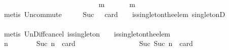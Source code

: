 \begin{isabellebody}
\ \ \ \ \ \ \ \ \ \ \ \ \isamarkupfalse%
\ {\isacartoucheopen}{\isasymforall}\ {\isasymsigma}\ {\isasymin}\ {\isasymSigma}{\isachardot}\ {\isasymforall}\ {\isasymsigma}{\isacharprime}\ {\isasymin}\ {\isasymSigma}{\isachardot}\ {\isasymnot}\ {\isasymsigma}\ {\isasymsubseteq}\ {\isasymsigma}{\isacharprime}\ {\isasymlongrightarrow}\ {\isacharparenleft}{\isasymexists}\ m\ {\isasymin}\ {\isasymsigma}\ {\isacharminus}\ {\isasymsigma}{\isacharprime}{\isachardot}\ {\isasymsigma}{\isacharprime}\ {\isasymunion}\ {\isacharbraceleft}m{\isacharbraceright}\ {\isasymin}\ {\isasymSigma}{\isacharparenright}{\isacartoucheclose}\ {\isacartoucheopen}{\isasymsigma}\ {\isasymin}\ {\isasymSigma}{\isacartoucheclose}\ {\isacartoucheopen}{\isasymsigma}{\isacharprime}\ {\isasymin}\ {\isasymSigma}{\isacartoucheclose}\isanewline
\ \ \ \ \ \ \ \ \ \ \ \ \isamarkupfalse%
\ {\isacharparenleft}metis\ Un{\isacharunderscore}commute\ {\isacartoucheopen}{\isasymnot}\ {\isasymsigma}\ {\isasymsubseteq}\ {\isasymsigma}{\isacharprime}\ {\isasymand}\ Suc\ {}\ {\isacharequal}\ card\ {\isacharparenleft}{\isasymsigma}\ {\isacharminus}\ {\isasymsigma}{\isacharprime}{\isacharparenright}{\isacartoucheclose}\ is{\isacharunderscore}singleton{\isacharunderscore}the{\isacharunderscore}elem\ singletonD{\isacharparenright}\isanewline
\ \ \ \ \ \ \ \ \ \ \isamarkupfalse%
\ \isamarkupfalse%
\ {\isachardoublequoteopen}{\isasymsigma}\ {\isasymunion}\ {\isasymsigma}{\isacharprime}\ {\isasymin}\ {\isasymSigma}{\isachardoublequoteclose}\isanewline
\ \ \ \ \ \ \ \ \ \ \ \ \isamarkupfalse%
\ {\isacharparenleft}metis\ Un{\isacharunderscore}Diff{\isacharunderscore}cancel{}\ {\isacartoucheopen}is{\isacharunderscore}singleton\ {\isacharparenleft}{\isasymsigma}\ {\isacharminus}\ {\isasymsigma}{\isacharprime}{\isacharparenright}{\isacartoucheclose}\ is{\isacharunderscore}singleton{\isacharunderscore}the{\isacharunderscore}elem{\isacharparenright}\ \ \ \isanewline
\ \ \ \ \ \ \ \ \isamarkupfalse%
\ \isanewline
\ \ \ \ \ \ \ \ \ \ \isamarkupfalse%
\ {\isachardoublequoteopen}{\isasymAnd}n{\isachardot}\ {\isasymforall}{\isasymsigma}{\isasymin}{\isasymSigma}{\isachardot}\ {\isasymforall}{\isasymsigma}{\isacharprime}{\isasymin}{\isasymSigma}{\isachardot}\ {\isasymnot}\ {\isasymsigma}\ {\isasymsubseteq}\ {\isasymsigma}{\isacharprime}\ {\isasymand}\ Suc\ n\ {\isacharequal}\ card\ {\isacharparenleft}{\isasymsigma}\ {\isacharminus}\ {\isasymsigma}{\isacharprime}{\isacharparenright}\ {\isasymlongrightarrow}\ {\isasymsigma}\ {\isasymunion}\ {\isasymsigma}{\isacharprime}\ {\isasymin}\ {\isasymSigma}\ {\isasymLongrightarrow}\ {\isasymforall}{\isasymsigma}{\isasymin}{\isasymSigma}{\isachardot}\ {\isasymforall}{\isasymsigma}{\isacharprime}{\isasymin}{\isasymSigma}{\isachardot}\ {\isasymnot}\ {\isasymsigma}\ {\isasymsubseteq}\ {\isasymsigma}{\isacharprime}\ {\isasymand}\ Suc\ {\isacharparenleft}Suc\ n{\isacharparenright}\ {\isacharequal}\ card\ {\isacharparenleft}{\isasymsigma}\ {\isacharminus}\ {\isasymsigma}{\isacharprime}{\isacharparenright}\ {\isasymlongrightarrow}\ {\isasymsigma}\ {\isasymunion}\ {\isasymsigma}{\isacharprime}\ {\isasymin}\ {\isasymSigma}{\isachardoublequoteclose}\isanewline

\end{isabellebody}
